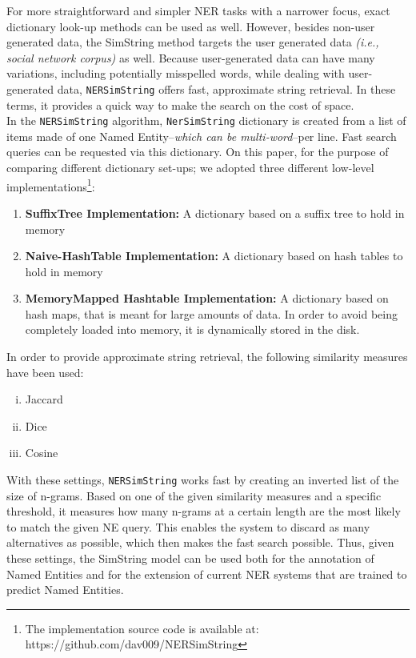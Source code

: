 For more straightforward and simpler NER tasks with a narrower focus, exact dictionary look-up methods can be used as well. However, besides non-user generated data, the SimString method targets the user generated data \emph{(i.e., social network corpus)} as well. Because user-generated data can have many variations, including potentially misspelled words, while dealing with user-generated data, \texttt{NERSimString} offers fast, approximate string retrieval. In these terms, it provides a quick way to make the search on the cost of space.\\

In the \texttt{NERSimString} algorithm, \texttt{NerSimString} dictionary is  created from a list of items made of one Named Entity--\emph{which can be multi-word}--per line. Fast search queries can be requested via this dictionary. On this paper, for the purpose of comparing different dictionary set-ups; we adopted three different low-level implementations\footnote{The implementation source code is available at: https://github.com/dav009/NERSimString}:
\begin{enumerate}
 	\item \textbf{SuffixTree Implementation:} A dictionary based on a suffix tree to hold in memory
 	\item \textbf{Naive-HashTable Implementation:} A dictionary based on hash tables to hold in memory
 	\item \textbf{MemoryMapped Hashtable Implementation:} A dictionary based on hash maps, that is meant for large amounts of data. In order to avoid being completely loaded into memory, it is dynamically stored in the disk.\end{enumerate}

In order to provide approximate string retrieval, the following similarity measures have been used:\\
\begin{enumerate}[i.]
			\item Jaccard
			\item Dice
			\item Cosine
\end{enumerate}
With these settings, \texttt{NERSimString} works fast by creating an inverted list of the size of n-grams. Based on one of the given similarity measures and a specific threshold, it measures how many n-grams at a certain length are the most likely to match the given NE query. This enables the system to discard as many alternatives as possible, which then makes the fast search possible. Thus, given these settings, the SimString model can be used both for the annotation of Named Entities and for the extension of current NER systems that are trained to predict Named Entities.